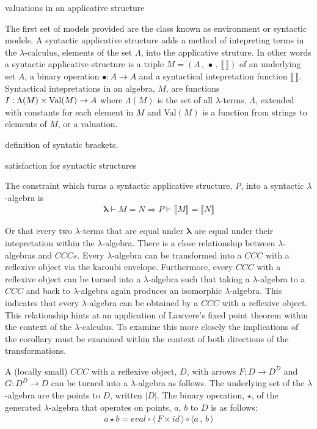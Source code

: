 valuations in an applicative structure

The first set of models provided are the class known as environment or syntactic
models. A syntactic applicative structure adds a method of intepreting terms in
the $\lambda$-calculus, elements of the set $\Lambda$, into the applicative
struture. In other words a syntactic applicative structure is a triple $M = (A
\, , \, \bullet \, , \, \llbracket \, \rrbracket)$ of an underlying set $A$, a
binary operation $\bullet : A \rightarrow A$ and a syntactical intepretation
function $\llbracket \, \rrbracket$. Syntactical intepretations in an algebra,
$M$,  are functions $I : \Lambda(M) \times \textnormal{Val}(M) \rightarrow A$
where $\Lambda(M)$ is the set of all $\lambda$-terms, $\Lambda$, extended with
constants for each element in $M$ and Val$(M)$ is a function from strings to
elements of $M$, or a valuation.

definition of syntatic brackets.

satisfaction for syntactic structures

The constraint which turns a syntactic applicative structure, \textit{P}, into a
syntactic $\lambda$-algebra is
\begin{align*}
    \bm{\lambda} \vdash M = N \Rightarrow P \models \llbracket M \rrbracket = \llbracket N
    \rrbracket
\end{align*}

Or that every two $\lambda$-terms that are equal under $\bm{\lambda}$ are equal
under their intepretation within the $\lambda$-algebra. There is a close
relationship between $\lambda$-algebras and $CCCs$. Every $\lambda$-algebra can be
transformed into a $CCC$ with a reflexive object via the karoubi
envelope. Furthermore, every $CCC$ with a reflexive object can be
turned into a $\lambda$-algebra such that taking a $\lambda$-algebra to a $CCC$
and back to $\lambda$-algebra again produces an isomorphic $\lambda$-algebra.
This indicates that every $\lambda$-algebra can be obtained by a $CCC$ with a
reflexive object. This relationship hints at an application of Lawvere's fixed
point theorem within the context of the $\lambda$-calculus. To examine this more
closely the implications of the corollary must be examined within the context of
both directions of the transformations.

A (locally small) $CCC$ with a reflexive object, $D$, with arrows $F : D
\rightarrow D^D$ and $G : D^D \rightarrow D$ can be turned into a
$\lambda$-algebra as follows. The underlying set of the $\lambda$-algebra are
the points to $D$, written $|D|$. The binary operation, $\star$, of the
generated $\lambda$-algebra that operates on points, $a$, $b$ to $D$ is as
follows:
\begin{align*}
    a \star b = eval \circ \langle \, F \times id \, \rangle \circ \langle a \,
    , \, b \,
    \rangle
\end{align*}

